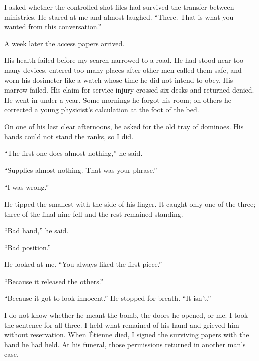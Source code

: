 I asked whether the controlled-shot files had survived the transfer between ministries. He stared at me and almost laughed. “There. That is what you wanted from this conversation.”\par

A week later the access papers arrived.\par

His health failed before my search narrowed to a road. He had stood near too many devices, entered too many places after other men called them safe, and worn his dosimeter like a watch whose time he did not intend to obey. His marrow failed. His claim for service injury crossed six desks and returned denied. He went in under a year. Some mornings he forgot his room; on others he corrected a young physicist's calculation at the foot of the bed.\par

On one of his last clear afternoons, he asked for the old tray of dominoes. His hands could not stand the ranks, so I did.\par

“The first one does almost nothing,” he said.\par

“Supplies almost nothing. That was your phrase.”\par

“I was wrong.”\par

He tipped the smallest with the side of his finger. It caught only one of the three; three of the final nine fell and the rest remained standing.\par

“Bad hand,” he said.\par

“Bad position.”\par

He looked at me. “You always liked the first piece.”\par

“Because it released the others.”\par

“Because it got to look innocent.” He stopped for breath. “It isn't.”\par

I do not know whether he meant the bomb, the doors he opened, or me. I took the sentence for all three. I held what remained of his hand and grieved him without reservation. When Étienne died, I signed the surviving papers with the hand he had held. At his funeral, those permissions returned in another man's case.\par

